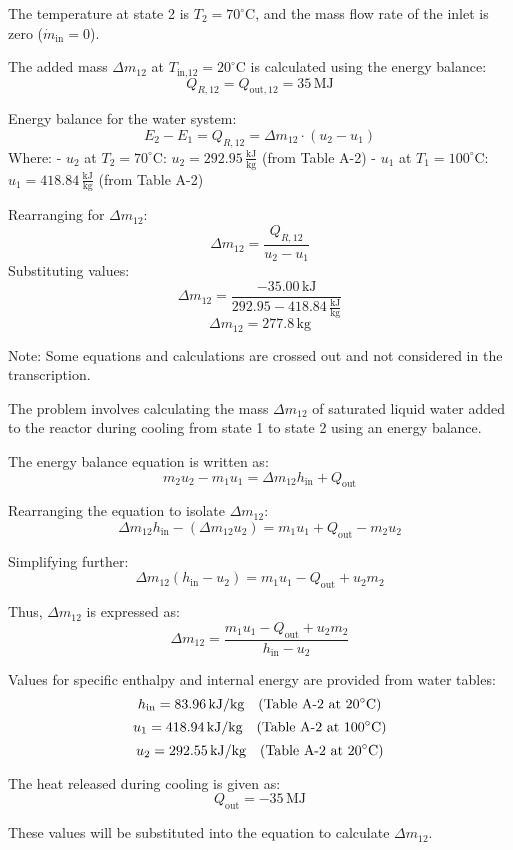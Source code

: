 The temperature at state 2 is \( T_2 = 70^\circ\text{C} \), and the mass flow rate of the inlet is zero (\( \dot{m}_{\text{in}} = 0 \)).  

The added mass \( \Delta m_{12} \) at \( T_{\text{in,12}} = 20^\circ\text{C} \) is calculated using the energy balance:  
\[
Q_{R,12} = Q_{\text{out},12} = 35 \, \text{MJ}
\]  

Energy balance for the water system:  
\[
E_2 - E_1 = Q_{R,12} = \Delta m_{12} \cdot (u_2 - u_1)
\]  
Where:  
- \( u_2 \) at \( T_2 = 70^\circ\text{C} \): \( u_2 = 292.95 \, \frac{\text{kJ}}{\text{kg}} \) (from Table A-2)  
- \( u_1 \) at \( T_1 = 100^\circ\text{C} \): \( u_1 = 418.84 \, \frac{\text{kJ}}{\text{kg}} \) (from Table A-2)  

Rearranging for \( \Delta m_{12} \):  
\[
\Delta m_{12} = \frac{Q_{R,12}}{u_2 - u_1}
\]  
Substituting values:  
\[
\Delta m_{12} = \frac{-35.00 \, \text{kJ}}{292.95 - 418.84 \, \frac{\text{kJ}}{\text{kg}}}
\]  
\[
\Delta m_{12} = 277.8 \, \text{kg}
\]  

Note: Some equations and calculations are crossed out and not considered in the transcription.

The problem involves calculating the mass \( \Delta m_{12} \) of saturated liquid water added to the reactor during cooling from state 1 to state 2 using an energy balance.  

The energy balance equation is written as:  
\[
m_2 u_2 - m_1 u_1 = \Delta m_{12} h_{\text{in}} + Q_{\text{out}}
\]  

Rearranging the equation to isolate \( \Delta m_{12} \):  
\[
\Delta m_{12} h_{\text{in}} - (\Delta m_{12} u_2) = m_1 u_1 + Q_{\text{out}} - m_2 u_2
\]  

Simplifying further:  
\[
\Delta m_{12} (h_{\text{in}} - u_2) = m_1 u_1 - Q_{\text{out}} + u_2 m_2
\]  

Thus, \( \Delta m_{12} \) is expressed as:  
\[
\Delta m_{12} = \frac{m_1 u_1 - Q_{\text{out}} + u_2 m_2}{h_{\text{in}} - u_2}
\]  

Values for specific enthalpy and internal energy are provided from water tables:  
\[
h_{\text{in}} = 83.96 \, \text{kJ/kg} \quad \text{(Table A-2 at \( 20^\circ\text{C} \))}  
\]  
\[
u_1 = 418.94 \, \text{kJ/kg} \quad \text{(Table A-2 at \( 100^\circ\text{C} \))}  
\]  
\[
u_2 = 292.55 \, \text{kJ/kg} \quad \text{(Table A-2 at \( 20^\circ\text{C} \))}  
\]  

The heat released during cooling is given as:  
\[
Q_{\text{out}} = -35 \, \text{MJ}
\]  

These values will be substituted into the equation to calculate \( \Delta m_{12} \).